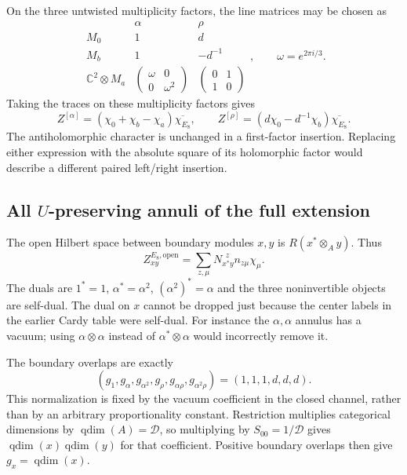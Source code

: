 On the three untwisted multiplicity factors, the line matrices
may be chosen as
\[
 \begin{array}{c|cc}
  &\alpha&\rho\\\hline
 M_0&1&d\\
 M_b&1&-d^{-1}\\
 \mathbb C^2\otimes M_a&
 \begin{pmatrix}\omega&0\\0&\omega^2\end{pmatrix}&
 \begin{pmatrix}0&1\\1&0\end{pmatrix}
 \end{array},\qquad\omega=e^{2\pi i/3}.
\]
Taking the traces on these multiplicity factors gives
\[
 Z^{[\alpha]}=(\chi_0+\chi_b-\chi_a)\overline{\chi_{E_8}},
 \qquad
 Z^{[\rho]}=(d\chi_0-d^{-1}\chi_b)\overline{\chi_{E_8}}.
\]
The antiholomorphic character is unchanged in a first-factor
insertion. Replacing either expression with the absolute square
of its holomorphic factor would describe a different paired
left/right insertion.

\subsection{All \texorpdfstring{$U$}{U}-preserving annuli of the full extension}

The open Hilbert space between boundary modules $x,y$ is
$R(x^*\otimes_Ay)$. Thus
\begin{equation}
 Z_{xy}^{E_8,\mathrm{open}}=
 \sum_{z,\mu}N_{x^*y}^{\ \ z}n_{z\mu}\chi_\mu.
 \label{expphysics:extension-annulus}
\end{equation}
The duals are $1^*=1$, $\alpha^*=\alpha^2$,
$(\alpha^2)^*=\alpha$ and the three noninvertible objects
are self-dual. The dual on $x$ cannot be dropped just because
the center labels in the earlier Cardy table were self-dual.
For instance the $\alpha,\alpha$ annulus has a vacuum;
using $\alpha\otimes\alpha$ instead of
$\alpha^*\otimes\alpha$ would incorrectly remove it.



The boundary overlaps are exactly
\[
 (g_1,g_\alpha,g_{\alpha^2},g_\rho,g_{\alpha\rho},g_{\alpha^2\rho})
 =(1,1,1,d,d,d).
\]
This normalization is fixed by the vacuum coefficient in the
closed channel, rather than by an arbitrary proportionality
constant. Restriction multiplies categorical dimensions by
$\operatorname{qdim}(A)=\mathcal D$, so multiplying by
$S_{00}=1/\mathcal D$ gives
$\operatorname{qdim}(x)\operatorname{qdim}(y)$ for that coefficient.
Positive boundary overlaps then give $g_x=\operatorname{qdim}(x)$.

